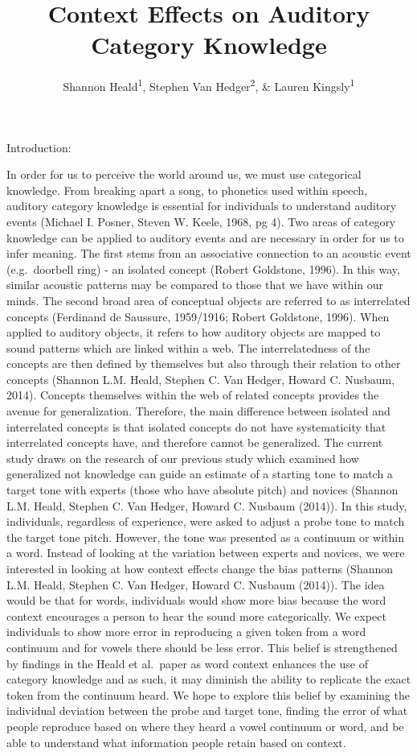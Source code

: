 \documentclass[
  man]{apa6}
\title{Context Effects on Auditory Category Knowledge}
\author{Shannon Heald\textsuperscript{1}, Stephen Van Hedger\textsuperscript{2}, \& Lauren Kingsly\textsuperscript{1}}
\date{}
\affiliation{\vspace{0.5cm}\textsuperscript{1} University of Chicago\\\textsuperscript{2} University of Western Ontario}
\begin{document}
\maketitle

Introduction:

In order for us to perceive the world around us, we must use categorical knowledge. From breaking apart a song, to phonetics used within speech, auditory category knowledge is essential for individuals to understand auditory events (Michael I. Posner, Steven W. Keele, 1968, pg 4).
Two areas of category knowledge can be applied to auditory events and are necessary in order for us to infer meaning. The first stems from an associative connection to an acoustic event (e.g.~doorbell ring) - an isolated concept (Robert Goldstone, 1996). In this way, similar acoustic patterns may be compared to those that we have within our minds. The second broad area of conceptual objects are referred to as interrelated concepts (Ferdinand de Saussure, 1959/1916; Robert Goldstone, 1996). When applied to auditory objects, it refers to how auditory objects are mapped to sound patterns which are linked within a web. The interrelatedness of the concepts are then defined by themselves but also through their relation to other concepts (Shannon L.M. Heald, Stephen C. Van Hedger, Howard C. Nusbaum, 2014). Concepts themselves within the web of related concepts provides the avenue for generalization. Therefore, the main difference between isolated and interrelated concepts is that isolated concepts do not have systematicity that interrelated concepts have, and therefore cannot be generalized. The current study draws on the research of our previous study which examined how generalized not knowledge can guide an estimate of a starting tone to match a target tone with experts (those who have absolute pitch) and novices (Shannon L.M. Heald, Stephen C. Van Hedger, Howard C. Nusbaum (2014)). In this study, individuals, regardless of experience, were asked to adjust a probe tone to match the target tone pitch. However, the tone was presented as a continuum or within a word. Instead of looking at the variation between experts and novices, we were interested in looking at how context effects change the bias patterns (Shannon L.M. Heald, Stephen C. Van Hedger, Howard C. Nusbaum (2014)). The idea would be that for words, individuals would show more bias because the word context encourages a person to hear the sound more categorically. We expect individuals to show more error in reproducing a given token from a word continuum and for vowels there should be less error. This belief is strengthened by findings in the Heald et al.~paper as word context enhances the use of category knowledge and as such, it may diminish the ability to replicate the exact token from the continuum heard. We hope to explore this belief by examining the individual deviation between the probe and target tone, finding the error of what people reproduce based on where they heard a vowel continuum or word, and be able to understand what information people retain based on context.
\end{document}
